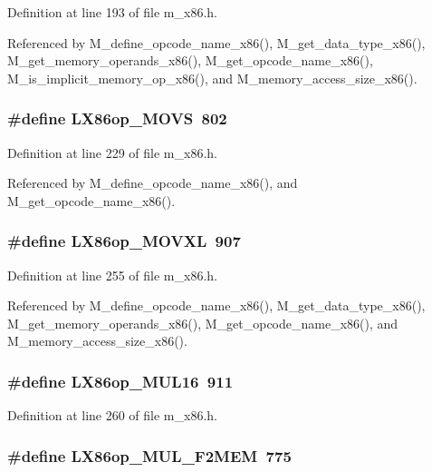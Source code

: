 Definition at line 193 of file m\_\-x86.h.

Referenced by M\_\-define\_\-opcode\_\-name\_\-x86(), M\_\-get\_\-data\_\-type\_\-x86(), M\_\-get\_\-memory\_\-operands\_\-x86(), M\_\-get\_\-opcode\_\-name\_\-x86(), M\_\-is\_\-implicit\_\-memory\_\-op\_\-x86(), and M\_\-memory\_\-access\_\-size\_\-x86().
\subsubsection{\setlength{\rightskip}{0pt plus 5cm}\#define LX86op\_\-MOVS~802}\label{m__x86_8h_e1d763531a5fbcb1528bea4ccda900ee}




Definition at line 229 of file m\_\-x86.h.

Referenced by M\_\-define\_\-opcode\_\-name\_\-x86(), and M\_\-get\_\-opcode\_\-name\_\-x86().
\subsubsection{\setlength{\rightskip}{0pt plus 5cm}\#define LX86op\_\-MOVXL~907}\label{m__x86_8h_c1af96304f9800ec0ac1a2a9fac562fb}




Definition at line 255 of file m\_\-x86.h.

Referenced by M\_\-define\_\-opcode\_\-name\_\-x86(), M\_\-get\_\-data\_\-type\_\-x86(), M\_\-get\_\-memory\_\-operands\_\-x86(), M\_\-get\_\-opcode\_\-name\_\-x86(), and M\_\-memory\_\-access\_\-size\_\-x86().
\subsubsection{\setlength{\rightskip}{0pt plus 5cm}\#define LX86op\_\-MUL16~911}\label{m__x86_8h_7eb819fe129becef7c556440c1fe04dc}




Definition at line 260 of file m\_\-x86.h.
\subsubsection{\setlength{\rightskip}{0pt plus 5cm}\#define LX86op\_\-MUL\_\-F2MEM~775}\label{m__x86_8h_63e8c29620d85bd52887355d736c6f87}




